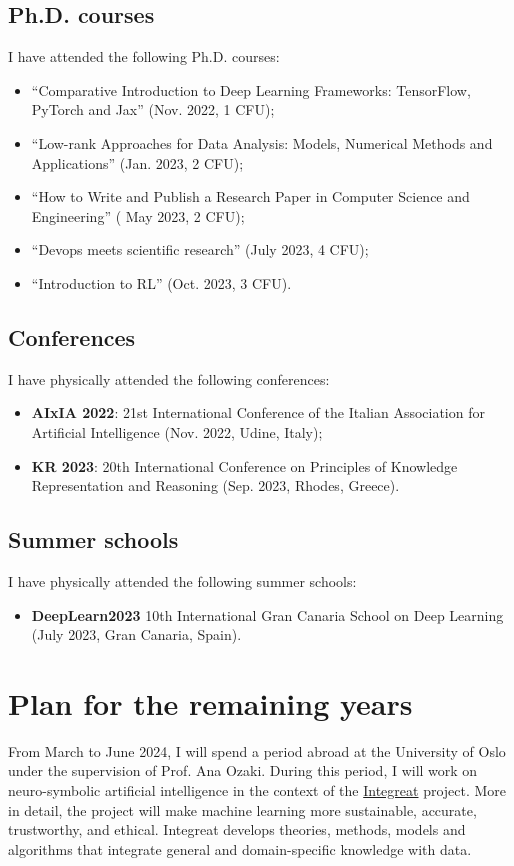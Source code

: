 \documentclass[]{scrartcl}
\begin{document}
    \subsection{Ph.D. courses}
    \label{sec:done:courses}
    I have attended the following Ph.D. courses:
    \begin{itemize}
        \item ``Comparative Introduction to Deep Learning Frameworks: TensorFlow, PyTorch and Jax'' (Nov. 2022, 1 CFU);
        \item ``Low-rank Approaches for Data Analysis: Models, Numerical Methods and Applications'' (Jan. 2023, 2 CFU);
        \item ``How to Write and Publish a Research Paper in Computer Science and Engineering'' ( May 2023, 2 CFU);
        \item ``Devops meets scientific research'' (July 2023, 4 CFU);
        \item ``Introduction to RL'' (Oct. 2023, 3 CFU).
    \end{itemize}

    \subsection{Conferences}
    \label{sec:done:conferences}
    I have physically attended the following conferences:
    \begin{itemize}
        \item \textbf{AIxIA 2022}: 21st International Conference of the Italian Association for Artificial Intelligence (Nov. 2022, Udine, Italy);
        \item \textbf{KR 2023}: 20th International Conference on Principles of Knowledge Representation and Reasoning (Sep. 2023, Rhodes, Greece).
    \end{itemize}

    \subsection{Summer schools}
    \label{sec:done:summerschools}
    I have physically attended the following summer schools:
    \begin{itemize}
        \item \textbf{DeepLearn2023} 10th International Gran Canaria School on Deep Learning (July 2023, Gran Canaria, Spain).
    \end{itemize}

    \section{Plan for the remaining years}
    \label{sec:todo}
    From March to June 2024, I will spend a period abroad at the University of Oslo under the supervision of Prof. Ana Ozaki.
    During this period, I will work on neuro-symbolic artificial intelligence in the context of the \href{https://www.integreat.no/index.html}{Integreat} project.
    More in detail, the project will make machine learning more sustainable, accurate, trustworthy, and ethical.
    Integreat develops theories, methods, models and algorithms that integrate general and domain-specific knowledge with data.

    
    
    
    
    
\end{document}
